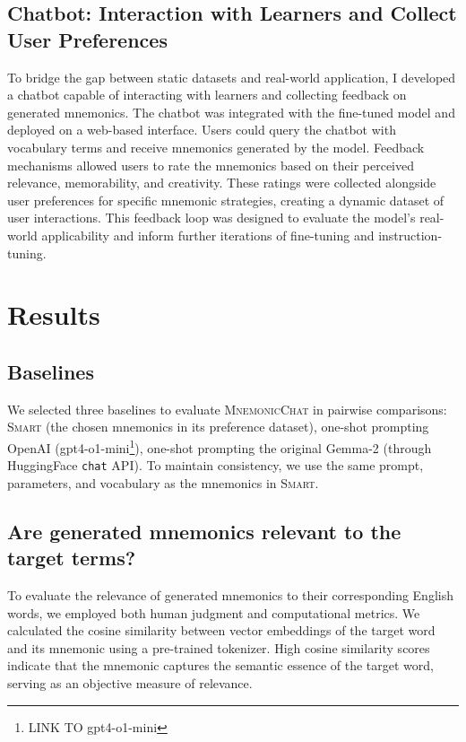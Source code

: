\documentclass{article}
\newcounter{para}
\begin{document}
\subsection{Chatbot: Interaction with Learners and Collect User Preferences} \label{sec:met-chatbot}

To bridge the gap between static datasets and real-world application, I developed a chatbot capable of interacting with learners and collecting feedback on generated mnemonics. The chatbot was integrated with the fine-tuned model and deployed on a web-based interface. Users could query the chatbot with vocabulary terms and receive mnemonics generated by the model. Feedback mechanisms allowed users to rate the mnemonics based on their perceived relevance, memorability, and creativity. These ratings were collected alongside user preferences for specific mnemonic strategies, creating a dynamic dataset of user interactions. This feedback loop was designed to evaluate the model’s real-world applicability and inform further iterations of fine-tuning and instruction-tuning.

\section{Results} \label{sec:results}
\subsection{Baselines} \label{sec:baselines}
We selected three baselines to evaluate \textsc{MnemonicChat} in pairwise comparisons: \textsc{Smart} (the chosen mnemonics in its preference dataset), one-shot prompting OpenAI (gpt4-o1-mini\footnote{LINK TO gpt4-o1-mini}), one-shot prompting the original Gemma-2 (through HuggingFace \verb|chat| API). To maintain consistency, we use the same prompt, parameters, and vocabulary as the mnemonics in \textsc{Smart}.

\subsection{Are generated mnemonics relevant to the target terms?} \label{sec:relevant}


To evaluate the relevance of generated mnemonics to their corresponding English words, we employed both human judgment and computational metrics. We calculated the cosine similarity between vector embeddings of the target word and its mnemonic using a pre-trained tokenizer. High cosine similarity scores indicate that the mnemonic captures the semantic essence of the target word, serving as an objective measure of relevance.
\end{document}
